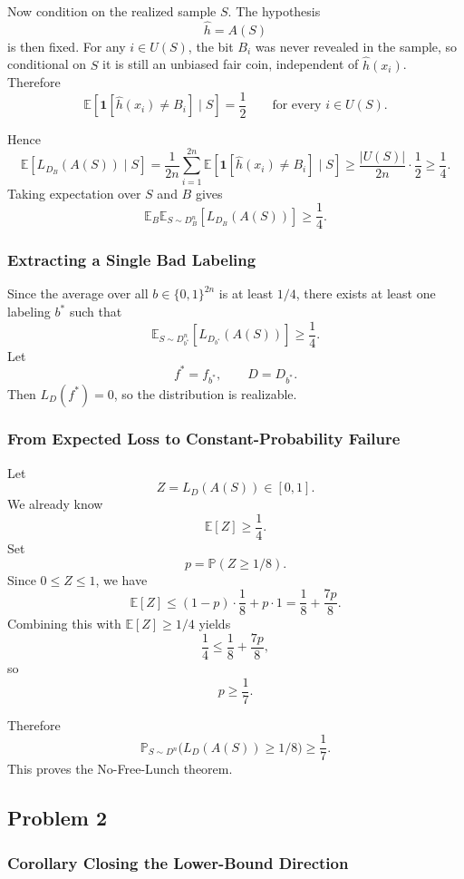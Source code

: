 \documentclass{article}
\theoremstyle{definition}
\theoremstyle{remark}
\newcommand{\EE}{\mathbb{E}}
\newcommand{\PP}{\mathbb{P}}
\newcommand{\ind}{\mathbf{1}}
\begin{document}
Now condition on the realized sample $S$. The hypothesis
$$
\widehat{h}=A(S)
$$
is then fixed. For any $i\in U(S)$, the bit $B_i$ was never revealed in the sample, so conditional on $S$ it is still an unbiased fair coin, independent of $\widehat{h}(x_i)$. Therefore
$$
\EE\!\left[\ind[\widehat{h}(x_i)\ne B_i]\mid S\right]=\frac{1}{2}
\qquad \text{for every } i\in U(S).
$$

Hence
$$
\EE\!\left[L_{D_B}(A(S))\mid S\right]
=
\frac{1}{2n}\sum_{i=1}^{2n}
\EE\!\left[\ind[\widehat{h}(x_i)\ne B_i]\mid S\right]
\ge
\frac{|U(S)|}{2n}\cdot \frac{1}{2}
\ge
\frac{1}{4}.
$$
Taking expectation over $S$ and $B$ gives
$$
\EE_{B}\EE_{S\sim D_B^n}[L_{D_B}(A(S))] \ge \frac{1}{4}.
$$

\subsubsection{Extracting a Single Bad Labeling}

Since the average over all $b\in\{0,1\}^{2n}$ is at least $1/4$, there exists at least one labeling $b^*$ such that
$$
\EE_{S\sim D_{b^*}^n}[L_{D_{b^*}}(A(S))] \ge \frac{1}{4}.
$$
Let
$$
f^*=f_{b^*},
\qquad
D=D_{b^*}.
$$
Then $L_D(f^*)=0$, so the distribution is realizable.

\subsubsection{From Expected Loss to Constant-Probability Failure}

Let
$$
Z = L_D(A(S)) \in [0,1].
$$
We already know
$$
\EE[Z] \ge \frac{1}{4}.
$$
Set
$$
p = \PP(Z \ge 1/8).
$$
Since $0\le Z\le 1$, we have
$$
\EE[Z]
\le
(1-p)\cdot \frac{1}{8} + p\cdot 1
=
\frac{1}{8} + \frac{7p}{8}.
$$
Combining this with $\EE[Z]\ge 1/4$ yields
$$
\frac{1}{4}
\le
\frac{1}{8}+\frac{7p}{8},
$$
so
$$
p \ge \frac{1}{7}.
$$

Therefore
$$
\PP_{S\sim D^n}\bigl(L_D(A(S))\ge 1/8\bigr)\ge \frac{1}{7}.
$$
This proves the No-Free-Lunch theorem.

\subsection{Problem 2}

\subsubsection{Corollary Closing the Lower-Bound Direction}
\end{document}
